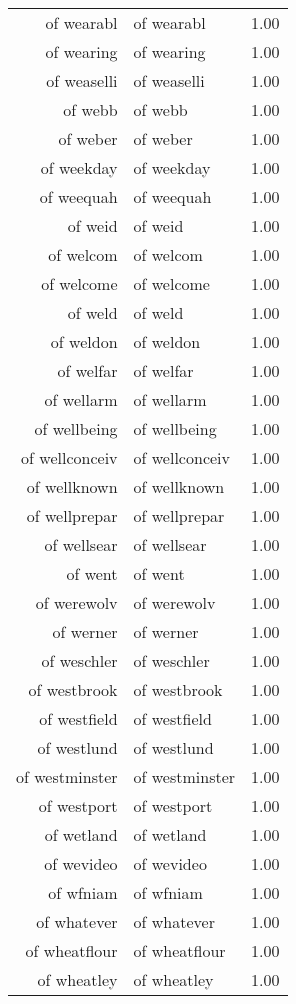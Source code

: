\begin{table}[ht]
\begin{tabular}{rlr}
  of wearabl & of wearabl & 1.00 \\ 
  of wearing & of wearing & 1.00 \\ 
  of weaselli & of weaselli & 1.00 \\ 
  of webb & of webb & 1.00 \\ 
  of weber & of weber & 1.00 \\ 
  of weekday & of weekday & 1.00 \\ 
  of weequah & of weequah & 1.00 \\ 
  of weid & of weid & 1.00 \\ 
  of welcom & of welcom & 1.00 \\ 
  of welcome & of welcome & 1.00 \\ 
  of weld & of weld & 1.00 \\ 
  of weldon & of weldon & 1.00 \\ 
  of welfar & of welfar & 1.00 \\ 
  of wellarm & of wellarm & 1.00 \\ 
  of wellbeing & of wellbeing & 1.00 \\ 
  of wellconceiv & of wellconceiv & 1.00 \\ 
  of wellknown & of wellknown & 1.00 \\ 
  of wellprepar & of wellprepar & 1.00 \\ 
  of wellsear & of wellsear & 1.00 \\ 
  of went & of went & 1.00 \\ 
  of werewolv & of werewolv & 1.00 \\ 
  of werner & of werner & 1.00 \\ 
  of weschler & of weschler & 1.00 \\ 
  of westbrook & of westbrook & 1.00 \\ 
  of westfield & of westfield & 1.00 \\ 
  of westlund & of westlund & 1.00 \\ 
  of westminster & of westminster & 1.00 \\ 
  of westport & of westport & 1.00 \\ 
  of wetland & of wetland & 1.00 \\ 
  of wevideo & of wevideo & 1.00 \\ 
  of wfniam & of wfniam & 1.00 \\ 
  of whatever & of whatever & 1.00 \\ 
  of wheatflour & of wheatflour & 1.00 \\ 
  of wheatley & of wheatley & 1.00 \\ 

\end{tabular}
\end{table}
